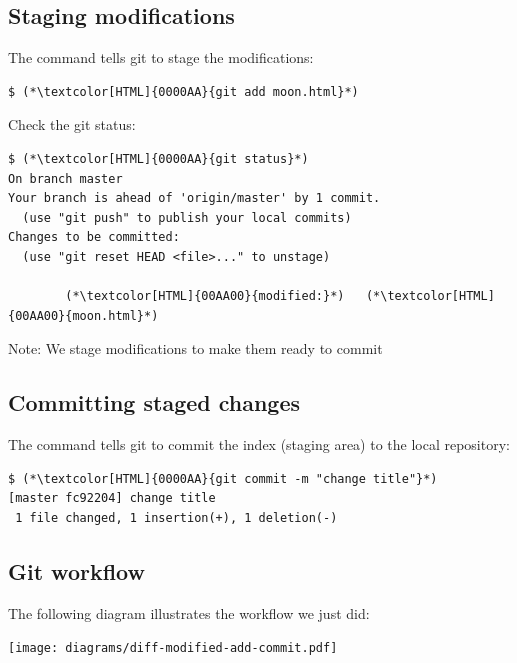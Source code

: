\subsection{Staging modifications}
\begin{frame}[fragile]
  \subslidetitle

  The command  tells git to stage the modifications:
  \begin{lstlisting}
$ (*\textcolor[HTML]{0000AA}{git add moon.html}*)
\end{lstlisting}

  Check the git status:
  \begin{lstlisting}
$ (*\textcolor[HTML]{0000AA}{git status}*)
On branch master
Your branch is ahead of 'origin/master' by 1 commit.
  (use "git push" to publish your local commits)
Changes to be committed:
  (use "git reset HEAD <file>..." to unstage)

        (*\textcolor[HTML]{00AA00}{modified:}*)   (*\textcolor[HTML]{00AA00}{moon.html}*)
\end{lstlisting}
  \vspace{1em}
  Note: We stage modifications to make them ready to commit
\end{frame}

\subsection{Committing staged changes}
\begin{frame}[fragile]
  \subslidetitle

  The command  tells git to commit the index (staging area) to the local repository:
  \begin{lstlisting}
$ (*\textcolor[HTML]{0000AA}{git commit -m "change title"}*)
[master fc92204] change title
 1 file changed, 1 insertion(+), 1 deletion(-)
\end{lstlisting}
\end{frame}

\subsection{Git workflow}
\begin{frame}[fragile]
  \subslidetitle
  The following diagram illustrates the workflow we just did: \\
  \vspace{2em}
  \centerline{\texttt{[image: diagrams/diff-modified-add-commit.pdf]}}
\end{frame}

